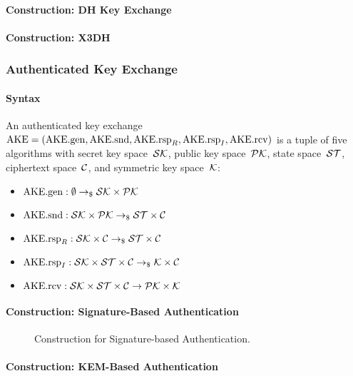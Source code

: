 \documentclass[a4paper,orivec]{llncs}
\begin{document}
\paragraph{Construction: DH Key Exchange}

\paragraph{Construction: X3DH}

\subsubsection{Authenticated Key Exchange}

\paragraph{Syntax}
An authenticated key exchange $\mathrm{AKE}=(\mathrm{AKE}.\mathrm{gen},\allowbreak\mathrm{AKE}.\mathrm{snd},\allowbreak\mathrm{AKE}.\mathrm{rsp}_R,\allowbreak\mathrm{AKE}.\mathrm{rsp}_I,\allowbreak\mathrm{AKE}.\mathrm{rcv})$ is a tuple of five algorithms with secret key space~$\mathcal{SK}$, public key space~$\mathcal{PK}$, state space~$\mathcal{ST}$, ciphertext space~$\mathcal{C}$, and symmetric key space~$\mathcal{K}$:

\begin{itemize}
    \item $\mathrm{AKE}.\mathrm{gen}: \emptyset \to_\$ \mathcal{SK}\times\mathcal{PK}$
    \item $\mathrm{AKE}.\mathrm{snd}: \mathcal{SK}\times\mathcal{PK} \to_\$ \mathcal{ST}\times\mathcal{C}$
    \item $\mathrm{AKE}.\mathrm{rsp}_R: \mathcal{SK}\times\mathcal{C} \to_\$ \mathcal{ST}\times\mathcal{C}$
    \item $\mathrm{AKE}.\mathrm{rsp}_I: \mathcal{SK}\times\mathcal{ST}\times\mathcal{C} \to_\$ \mathcal{K}\times\mathcal{C}$
    \item $\mathrm{AKE}.\mathrm{rcv}: \mathcal{SK}\times\mathcal{ST}\times\mathcal{C} \to \mathcal{PK}\times\mathcal{K}$
\end{itemize}

\paragraph{Construction: Signature-Based Authentication}

\begin{figure}[!ht]
      \centering
      \fbox{\scalebox{\codescalefactor}{}}
      \caption{Construction for Signature-based Authentication.}
      \label{fig:sig_based_auth}
\end{figure}

\paragraph{Construction: KEM-Based Authentication}
\end{document}

